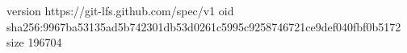 version https://git-lfs.github.com/spec/v1
oid sha256:9967ba53135ad5b742301db53d0261c5995c9258746721ce9def040fbf0b5172
size 196704
